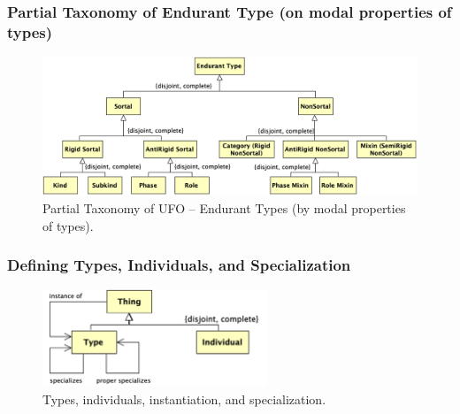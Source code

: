 \documentclass{article}
\newcommand{\BeginEndurantTaxonomyOfNaturesBegin}{147}
\newcommand{\EndEndurantTaxonomyOfNaturesEnd}{192}
\newcommand{\BeginEndurantTaxonomyOfPropertiesBegin}{194}
\newcommand{\EndEndurantTaxonomyOfPropertiesEnd}{271}
\begin{document}


\subsubsection{Partial Taxonomy of Endurant Type (on modal properties of types)}

\begin{figure}[ht]
    \centering
    \includegraphics[width=\textwidth]{diagrams/Endurant_Type_Properties_Diagram.png}
    \caption{Partial Taxonomy of UFO -- Endurant Types (by modal properties of types).}
    \label{fig:ufo_taxonomy_endurant_types_properties}
\end{figure}



\subsubsection{Defining Types, Individuals, and Specialization}

\begin{figure}[ht]
    \centering
    \includegraphics[width=0.6\textwidth]{diagrams/Instantiation_Diagram.png}
    \caption{Types, individuals, instantiation, and specialization.}
    \label{fig:instantiation_and_specialization}
\end{figure}
\end{document}
